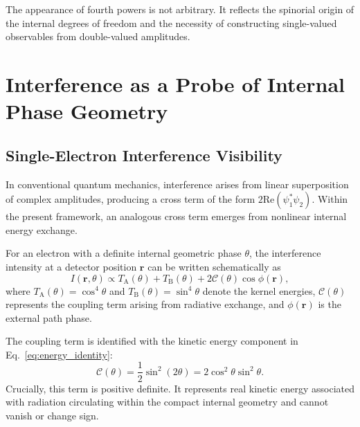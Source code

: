 \documentclass[%
 reprint,
 amsmath,amssymb,
 aps,
 prb,
]{revtex4-2}
\numberwithin{equation}{section}
\begin{document}
The appearance of fourth powers is not arbitrary. It reflects the spinorial origin of the internal degrees of freedom and the necessity of constructing single-valued observables from double-valued amplitudes.


\section{Interference as a Probe of Internal Phase Geometry}
\label{sec:interference}

\subsection{Single-Electron Interference Visibility}
\label{subsec:single_visibility}

In conventional quantum mechanics, interference arises from linear superposition of complex amplitudes, producing a cross term of the form $2\mathrm{Re}(\psi_1^*\psi_2)$. Within the present framework, an analogous cross term emerges from nonlinear internal energy exchange.

For an electron with a definite internal geometric phase $\theta$, the interference intensity at a detector position $\mathbf{r}$ can be written schematically as
\begin{equation}
I(\mathbf{r},\theta) \propto T_{\mathrm{A}}(\theta) + T_{\mathrm{B}}(\theta) + 2\mathcal{C}(\theta)\cos\phi(\mathbf{r}),
\label{eq:intensity_pattern}
\end{equation}
where $T_{\mathrm{A}}(\theta) = \cos^4\theta$ and $T_{\mathrm{B}}(\theta) = \sin^4\theta$ denote the kernel energies, $\mathcal{C}(\theta)$ represents the coupling term arising from radiative exchange, and $\phi(\mathbf{r})$ is the external path phase.

The coupling term is identified with the kinetic energy component in Eq.~\eqref{eq:energy_identity}:
\begin{equation}
\mathcal{C}(\theta) = \frac{1}{2}\sin^2(2\theta) = 2\cos^2\theta\sin^2\theta.
\label{eq:coupling_term}
\end{equation}
Crucially, this term is positive definite. It represents real kinetic energy associated with radiation circulating within the compact internal geometry and cannot vanish or change sign.
\end{document}
